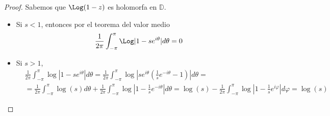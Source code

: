 \begin{proof}
    Sabemos que $\Log(1-z)$ es holomorfa en $\mathbb{D}$.
    \begin{itemize}
        \item Si $s < 1$, entonces por el teorema del valor medio
              $$\frac{1}{2\pi} \int_{-\pi}^\pi \Log|1-se^{i\theta}|d\theta = 0$$

        \item Si $s > 1$,
              \begin{align*}
                   & \frac{1}{2\pi} \int_{-\pi}^\pi \log|1-se^{i\theta}|d\theta = \frac{1}{2\pi} \int_{-\pi}^\pi \log\left|se^{i\theta}\left(\frac{1}{s}e^{-i\theta}-1\right)\right|d\theta =                                                                   \\
                   & = \frac{1}{2\pi} \int_{-\pi}^\pi \log(s)d\theta + \frac{1}{2\pi} \int_{-\pi}^\pi \log\left|1-\frac{1}{s}e^{-i\theta}\right|d\theta = \log(s) - \frac{1}{2\pi} \int_{-\pi}^\pi \log\left|1-\frac{1}{s}e^{i\varphi}\right|d\varphi = \log(s)
              \end{align*}


\end{itemize}
\end{proof}
